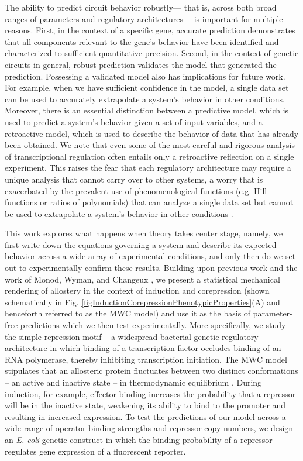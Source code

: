 The ability to predict circuit behavior robustly— that is, across both broad
ranges of parameters and regulatory architectures —is important for multiple
reasons. First, in the context of a specific gene, accurate prediction
demonstrates that all components relevant to the gene’s behavior have been
identified and characterized to sufficient quantitative precision. Second, in
the context of genetic circuits in general, robust prediction validates the
model that generated the prediction. Possessing a validated model also has
implications for future work. For example, when we have sufficient confidence
in the model, a single data set can be used to accurately extrapolate a
system’s behavior in other conditions. Moreover, there is an essential
distinction between a predictive model, which is used to predict a system’s
behavior given a set of input variables, and a retroactive model, which is
used to describe the behavior of data that has already been obtained. We note
that even some of the most careful and rigorous analysis of transcriptional
regulation often entails only a retroactive reflection on a single
experiment. This raises the fear that each regulatory architecture may
require a unique analysis that cannot carry over to other systems, a worry
that is exacerbated by the prevalent use of phenomenological functions (e.g.
Hill functions or ratios of polynomials) that can analyze a single data set
but cannot be used to extrapolate a system’s behavior in other conditions
\cite{Setty2003, Poelwijk2011, Vilar2013, Rogers2015, Rohlhill2017}.

This work explores what happens when theory takes center stage, namely, we
first write down the equations governing a system and describe its expected
behavior across a wide array of experimental conditions, and only then do we
set out to experimentally confirm these results. Building upon previous work
\cite{Garcia2011,Brewster2014,Weinert2014} and the work of Monod, Wyman, and
Changeux \cite{MONOD1965}, we present a statistical mechanical rendering of
allostery in the context of induction and corepression (shown schematically
in Fig. \ref{figInductionCorepressionPhenotypicProperties}(A) and
henceforth referred to as the MWC model) and use it as the basis of
parameter-free predictions which we then test experimentally. More
specifically, we study the simple repression motif – a widespread bacterial
genetic regulatory architecture in which binding of a transcription factor
occludes binding of an RNA polymerase, thereby inhibiting transcription
initiation. The MWC model stipulates that an allosteric protein fluctuates
between two distinct conformations – an active and inactive state – in
thermodynamic equilibrium \cite{MONOD1965}. During induction, for example,
effector binding increases the probability that a repressor will be in the
inactive state, weakening its ability to bind to the promoter and resulting
in increased expression. To test the predictions of our model across a wide
range of operator binding strengths and repressor copy numbers, we design an
\textit{E. coli} genetic construct in which the binding probability of a
repressor regulates gene expression of a fluorescent reporter.

